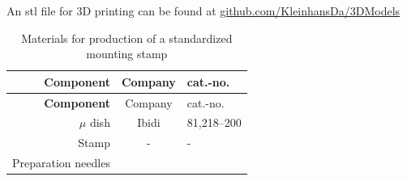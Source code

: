 \documentclass[11pt,singlespacinge,twoside]{reedthesis} %
\theoremstyle{definition}
\theoremstyle{definition}
\theoremstyle{definition}
\theoremstyle{remark}
\begin{document}
An stl file for 3D printing can be found at \href{https://github.com/KleinhansDa/3DModels}{github.com/KleinhansDa/3DModels}
\begin{longtable}[]{@{}rcl@{}}
\caption{\label{tab:mat-mount} Materials for production of a standardized mounting stamp}\tabularnewline
\toprule
\begin{minipage}[b]{0.50\columnwidth}\raggedleft
\textbf{Component}\strut
\end{minipage} & \begin{minipage}[b]{0.26\columnwidth}\centering
Company\strut
\end{minipage} & \begin{minipage}[b]{0.16\columnwidth}\raggedright
cat.-no.\strut
\end{minipage}\tabularnewline
\midrule
\endfirsthead
\toprule
\begin{minipage}[b]{0.50\columnwidth}\raggedleft
\textbf{Component}\strut
\end{minipage} & \begin{minipage}[b]{0.26\columnwidth}\centering
Company\strut
\end{minipage} & \begin{minipage}[b]{0.16\columnwidth}\raggedright
cat.-no.\strut
\end{minipage}\tabularnewline
\midrule
\endhead
\begin{minipage}[t]{0.50\columnwidth}\raggedleft
\(\mu\) dish\strut
\end{minipage} & \begin{minipage}[t]{0.26\columnwidth}\centering
Ibidi\strut
\end{minipage} & \begin{minipage}[t]{0.16\columnwidth}\raggedright
81,218--200\strut
\end{minipage}\tabularnewline
\begin{minipage}[t]{0.50\columnwidth}\raggedleft
Stamp\strut
\end{minipage} & \begin{minipage}[t]{0.26\columnwidth}\centering
-\strut
\end{minipage} & \begin{minipage}[t]{0.16\columnwidth}\raggedright
-\strut
\end{minipage}\tabularnewline
\begin{minipage}[t]{0.50\columnwidth}\raggedleft
Preparation needles\strut
\end{minipage} & \begin{minipage}[t]{0.26\columnwidth}\centering

\end{minipage}
\end{longtable}
\end{document}
